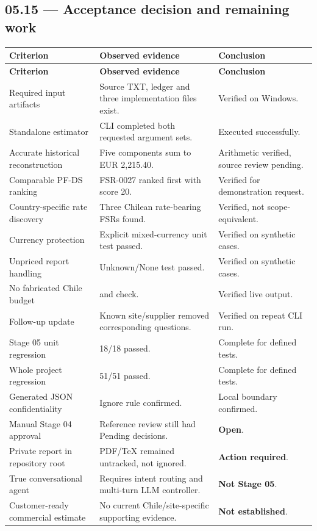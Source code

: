\documentclass[11pt,a4paper]{article}
\DeclareRobustCommand{\code}[1]{{\ttfamily\small\detokenize{#1}}}
\begin{document}
\subsection{05.15 --- Acceptance decision and remaining work}
\begin{longtable}{@{}L{54mm}L{50mm}L{43mm}@{}}
\toprule
\textbf{Criterion} & \textbf{Observed evidence} & \textbf{Conclusion}\\
\midrule\endfirsthead
\toprule\textbf{Criterion} & \textbf{Observed evidence} & \textbf{Conclusion}\\
\midrule\endhead
Required input artifacts & Source TXT, ledger and three implementation files exist. & Verified on Windows.\\
Standalone estimator & CLI completed both requested argument sets. & Executed successfully.\\
Accurate historical reconstruction & Five components sum to EUR 2,215.40. & Arithmetic verified, source review pending.\\
Comparable PF-DS ranking & FSR-0027 ranked first with score 20. & Verified for demonstration request.\\
Country-specific rate discovery & Three Chilean rate-bearing FSRs found. & Verified, not scope-equivalent.\\
Currency protection & Explicit mixed-currency unit test passed. & Verified on synthetic cases.\\
Unpriced report handling & Unknown/None test passed. & Verified on synthetic cases.\\
No fabricated Chile budget & \code{site_specific_budget=null} and \code{True} check. & Verified live output.\\
Follow-up update & Known site/supplier removed corresponding questions. & Verified on repeat CLI run.\\
Stage 05 unit regression & 18/18 passed. & Complete for defined tests.\\
Whole project regression & 51/51 passed. & Complete for defined tests.\\
Generated JSON confidentiality & Ignore rule confirmed. & Local boundary confirmed.\\
Manual Stage 04 approval & Reference review still had Pending decisions. & \textbf{Open}.\\
Private report in repository root & PDF/TeX remained untracked, not ignored. & \textbf{Action required}.\\
True conversational agent & Requires intent routing and multi-turn LLM controller. & \textbf{Not Stage 05}.\\
Customer-ready commercial estimate & No current Chile/site-specific supporting evidence. & \textbf{Not established}.\\
\bottomrule
\end{longtable}
\end{document}
